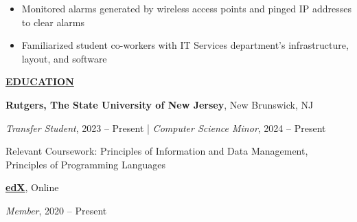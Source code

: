 \documentclass[
]{article}
\providecommand{\tightlist}{%
  \setlength{\itemsep}{0pt}\setlength{\parskip}{0pt}}
\begin{document}
\begin{itemize}
\item
  Monitored alarms generated by wireless access points and pinged IP
  addresses to clear alarms
\item
  Familiarized student co-workers with IT Services department's
  infrastructure, layout, and software
\end{itemize}






\textbf{\underline{EDUCATION}}

\textbf{Rutgers, The State University of New Jersey}, New Brunswick, NJ

\emph{Transfer Student}, 2023 -- Present | \emph{Computer Science Minor}, 2024 -- Present


Relevant Coursework: Principles of Information and Data Management, Principles of Programming Languages


\href{https://www.edx.org/}{\textbf{edX}}, Online

\emph{Member}, 2020 -- Present
\end{document}
